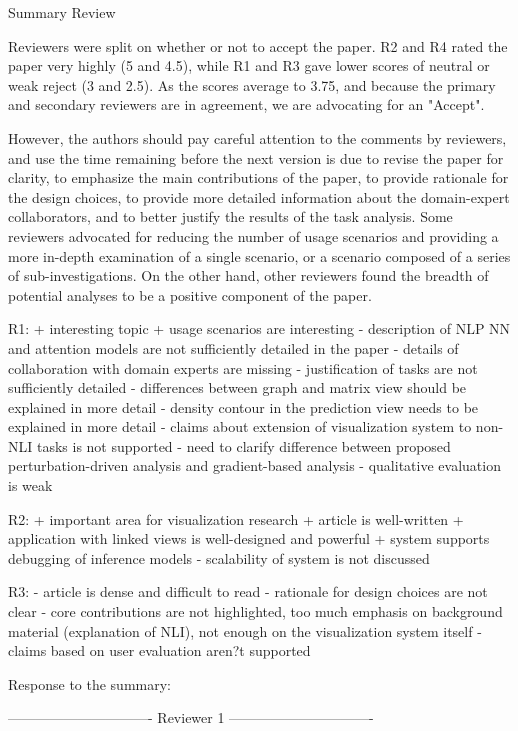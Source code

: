 Summary Review

Reviewers were split on whether or not to accept the paper. R2 and R4 rated the paper very highly (5 and 4.5), while R1 and R3 gave lower scores of neutral or weak reject (3 and 2.5). As the scores average to 3.75, and because the primary and secondary reviewers are in agreement, we are advocating for an "Accept".

However, the authors should pay careful attention to the comments by reviewers, and use the time remaining before the next version is due to revise the paper for clarity, to emphasize the main contributions of the paper, to provide rationale for the design choices, to provide more detailed information about the domain-expert collaborators, and to better justify the results of the task analysis. Some reviewers advocated for reducing the number of usage scenarios and providing a more in-depth examination of a single scenario, or a scenario composed of a series of sub-investigations. On the other hand, other reviewers found the breadth of potential analyses to be a positive component of the paper.

R1:
+ interesting topic
+ usage scenarios are interesting
- description of NLP NN and attention models are not sufficiently detailed in the paper
- details of collaboration with domain experts are missing
- justification of tasks are not sufficiently detailed
- differences between graph and matrix view should be explained in more detail
- density contour in the prediction view needs to be explained in more detail
- claims about extension of visualization system to non-NLI tasks is not supported
- need to clarify difference between proposed perturbation-driven analysis and gradient-based analysis
- qualitative evaluation is weak

R2:
+ important area for visualization research
+ article is well-written
+ application with linked views is well-designed and powerful
+ system supports debugging of inference models
- scalability of system is not discussed

R3:
- article is dense and difficult to read
- rationale for design choices are not clear
- core contributions are not highlighted, too much emphasis on background material (explanation of NLI), not enough on the visualization system itself
- claims based on user evaluation aren?t supported

Response to the summary:


------------------------------- Reviewer 1 -------------------------------


